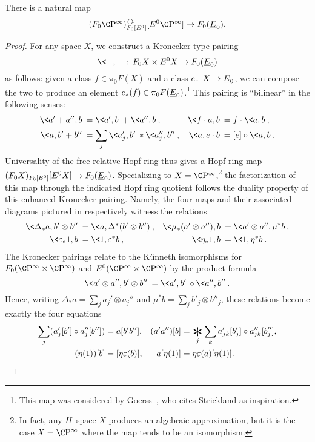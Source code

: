 \begin{lemma}\label{HopfRingComparisonMap}
There is a natural map \[(F_0 \CP^\infty)_{F_0[E^0]}^{\circulatearrows}[E^0 \CP^\infty] \to F_0(\OS{E}{0}).\]
\end{lemma}
\begin{proof}
For any space \(X\), we construct a Kronecker-type pairing \[\<-,-\>\co F_0 X \times E^0 X \to F_0(\OS{E}{0})\] as follows: given a class \(f \in \pi_0 F(X)\) and a class \(e\co X \to \OS{E}{0}\), we can compose the two to produce an element \(e_*(f) \in \pi_0 F(\OS{E}{0})\).\footnote{This map was considered by Goerss~\cite[Proposition 10.2]{GoerssDieudonne}, who cites Strickland as inspiration.}  This pairing is ``bilinear'' in the following senses:
\begin{align*}
\<a' + a'', b\> & = \<a', b\> + \<a'', b\>, &
\<f \cdot a, b\> & = f \cdot \<a, b\>, \\
\<a, b' + b''\> & = \sum_j \<a'_j, b'\> \ast \<a''_j, b''\>, &
\<a, e \cdot b\> & = [e] \circ \<a, b\>.
\end{align*}
Universality of the free relative Hopf ring thus gives a Hopf ring map \((F_0 X)_{F_0[E^0]}[E^0 X] \to F_0(\OS{E}{0})\).  Specializing to \(X = \CP^\infty\),\footnote{In fact, any $H$--space $X$ produces an algebraic approximation, but it is the case $X = \CP^\infty$ where the map tends to be an isomorphism.} the factorization of this map through the indicated Hopf ring quotient follows the duality property of this enhanced Kronecker pairing.  Namely, the four maps and their associated diagrams pictured in  respectively witness the relations
\begin{align*}
\<\Delta_* a, b' \otimes b''\> & = \<a, \Delta^*(b' \otimes b'')\>, &
\<\mu_*(a' \otimes a''), b\> & = \<a' \otimes a'', \mu^* b\>, \\
\<\eps_* 1, b\> & = \<1, \eps^* b\>, &
\<\eta_* 1, b\> & = \<1, \eta^* b\>.
\end{align*}
The Kronecker pairings relate to the K\"unneth isomorphisms for \(F_0(\CP^\infty \times \CP^\infty)\) and \(E^0(\CP^\infty \times \CP^\infty)\) by the product formula \[\<a' \otimes a'', b' \otimes b''\> = \<a', b'\> \circ \<a'', b''\>.\]  Hence, writing \(\Delta_* a = \sum_j a_j' \otimes a_j''\) and \(\mu^* b = \sum_j b'_j \otimes b''_j\), these relations become exactly the four equations
\begin{align*}
\sum_j (a'_j[b'] \circ a''_j[b'']) & = a[b'b''], &
(a' a'')[b] & = \bigast_j \sum_k a_{jk}'[b'_j] \circ a_{jk}''[b''_j], \\
(\eta(1))[b] & = [\eta\eps(b)], &
a[\eta(1)] & = \eta\eps(a)[\eta(1)].
\qedhere
\end{align*}
\end{proof}

